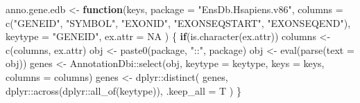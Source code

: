 \documentclass[
]{article}
\newenvironment{Shaded}{\begin{snugshade}}{\end{snugshade}}
\newcommand{\AttributeTok}[1]{\textcolor[rgb]{0.77,0.63,0.00}{#1}}
\newcommand{\ConstantTok}[1]{\textcolor[rgb]{0.00,0.00,0.00}{#1}}
\newcommand{\ControlFlowTok}[1]{\textcolor[rgb]{0.13,0.29,0.53}{\textbf{#1}}}
\newcommand{\FunctionTok}[1]{\textcolor[rgb]{0.00,0.00,0.00}{#1}}
\newcommand{\NormalTok}[1]{#1}
\newcommand{\OtherTok}[1]{\textcolor[rgb]{0.56,0.35,0.01}{#1}}
\newcommand{\SpecialCharTok}[1]{\textcolor[rgb]{0.00,0.00,0.00}{#1}}
\newcommand{\StringTok}[1]{\textcolor[rgb]{0.31,0.60,0.02}{#1}}
\begin{document}
\begin{Shaded}
\begin{Highlighting}[]
\NormalTok{anno.gene.edb }\OtherTok{\textless{}{-}} 
  \ControlFlowTok{function}\NormalTok{(keys,}
    \AttributeTok{package =} \StringTok{"EnsDb.Hsapiens.v86"}\NormalTok{,}
    \AttributeTok{columns =} \FunctionTok{c}\NormalTok{(}\StringTok{"GENEID"}\NormalTok{, }\StringTok{"SYMBOL"}\NormalTok{, }\StringTok{"EXONID"}\NormalTok{,}
      \StringTok{"EXONSEQSTART"}\NormalTok{, }\StringTok{"EXONSEQEND"}\NormalTok{),}
    \AttributeTok{keytype =} \StringTok{"GENEID"}\NormalTok{,}
    \AttributeTok{ex.attr =} \ConstantTok{NA}
\NormalTok{    )}
\NormalTok{  \{}
    \ControlFlowTok{if}\NormalTok{(}\FunctionTok{is.character}\NormalTok{(ex.attr))}
\NormalTok{      columns }\OtherTok{\textless{}{-}} \FunctionTok{c}\NormalTok{(columns, ex.attr)}
\NormalTok{    obj }\OtherTok{\textless{}{-}} \FunctionTok{paste0}\NormalTok{(package, }\StringTok{"::"}\NormalTok{, package)}
\NormalTok{    obj }\OtherTok{\textless{}{-}} \FunctionTok{eval}\NormalTok{(}\FunctionTok{parse}\NormalTok{(}\AttributeTok{text =}\NormalTok{ obj))}
\NormalTok{    genes }\OtherTok{\textless{}{-}}\NormalTok{ AnnotationDbi}\SpecialCharTok{::}\FunctionTok{select}\NormalTok{(obj,}
      \AttributeTok{keytype =}\NormalTok{ keytype,}
      \AttributeTok{keys =}\NormalTok{ keys,}
      \AttributeTok{columns =}\NormalTok{ columns)}
\NormalTok{    genes }\OtherTok{\textless{}{-}}\NormalTok{ dplyr}\SpecialCharTok{::}\FunctionTok{distinct}\NormalTok{(}
\NormalTok{      genes, dplyr}\SpecialCharTok{::}\FunctionTok{across}\NormalTok{(dplyr}\SpecialCharTok{::}\FunctionTok{all\_of}\NormalTok{(keytype)), }\AttributeTok{.keep\_all =}\NormalTok{ T}
\NormalTok{    )}
\NormalTok{  \}}


\end{Highlighting}
\end{Shaded}
\end{document}
